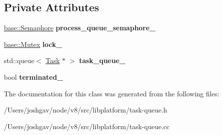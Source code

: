 \subsection*{Private Attributes}
\begin{DoxyCompactItemize}
\item 
\hyperlink{classv8_1_1base_1_1_semaphore}{base\+::\+Semaphore} {\bfseries process\+\_\+queue\+\_\+semaphore\+\_\+}\hypertarget{classv8_1_1platform_1_1_task_queue_ac0886ec14c15a9169e6eae88218bb2be}{}\label{classv8_1_1platform_1_1_task_queue_ac0886ec14c15a9169e6eae88218bb2be}

\item 
\hyperlink{classv8_1_1base_1_1_mutex}{base\+::\+Mutex} {\bfseries lock\+\_\+}\hypertarget{classv8_1_1platform_1_1_task_queue_a8a95c21dadce1d499e5c0ad9d4e6573f}{}\label{classv8_1_1platform_1_1_task_queue_a8a95c21dadce1d499e5c0ad9d4e6573f}

\item 
std\+::queue$<$ \hyperlink{classv8_1_1_task}{Task} $\ast$ $>$ {\bfseries task\+\_\+queue\+\_\+}\hypertarget{classv8_1_1platform_1_1_task_queue_a0b25953fcc74a57266791c3c6cdf1a51}{}\label{classv8_1_1platform_1_1_task_queue_a0b25953fcc74a57266791c3c6cdf1a51}

\item 
bool {\bfseries terminated\+\_\+}\hypertarget{classv8_1_1platform_1_1_task_queue_a44af4fe2088b22583ce3c811816c33c2}{}\label{classv8_1_1platform_1_1_task_queue_a44af4fe2088b22583ce3c811816c33c2}

\end{DoxyCompactItemize}


The documentation for this class was generated from the following files\+:\begin{DoxyCompactItemize}
\item 
/\+Users/joshgav/node/v8/src/libplatform/task-\/queue.\+h\item 
/\+Users/joshgav/node/v8/src/libplatform/task-\/queue.\+cc\end{DoxyCompactItemize}
